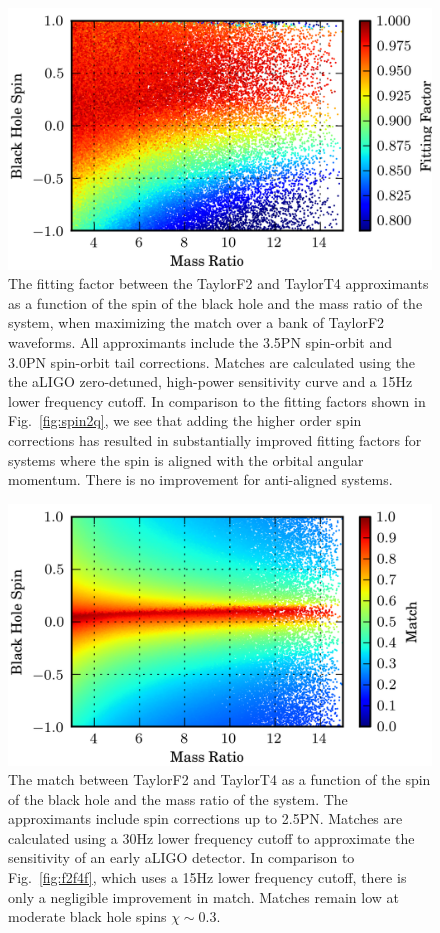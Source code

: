 \begin{figure}
\begin{center}
\includegraphics[width=1.0	extwidth]{papers/nsbh_faithfulness/figure14.png}
\end{center}
\caption{\label{fig:spin2q7}The fitting factor between the TaylorF2 and
TaylorT4 approximants as a function of the spin of the black hole
and the mass ratio of the system, when maximizing the match over a bank of
TaylorF2 waveforms. All approximants include the 3.5\ac{PN} spin-orbit and 3.0\ac{PN} 
spin-orbit tail corrections. 
Matches are calculated using the the aLIGO
zero-detuned, high-power sensitivity curve and a 15Hz lower frequency cutoff. In 
comparison to the fitting factors shown in Fig.~\ref{fig:spin2q}, we see that adding
the higher order spin corrections has resulted in substantially improved fitting factors for 
systems where the spin is aligned with the orbital angular momentum. There is no 
improvement for anti-aligned systems.
}
\end{figure}


\begin{figure}
\begin{center}
\includegraphics[width=1.0	extwidth]{papers/nsbh_faithfulness/figure15.png}
\end{center}
\caption{\label{fig:5f2t430}The match between TaylorF2 and
TaylorT4 as a function of the spin of the black hole
and the mass ratio of the system. The approximants include spin corrections up to 2.5\ac{PN}. 
Matches are calculated using a 30Hz lower frequency cutoff to
approximate the sensitivity of an early \ac{aLIGO} detector. In comparison to Fig.~\ref{fig:f2f4f}, which uses a 15Hz lower
frequency cutoff, there is only a negligible improvement in match. Matches remain low at moderate black hole spins
$\chi \sim 0.3$.}
\end{figure}


